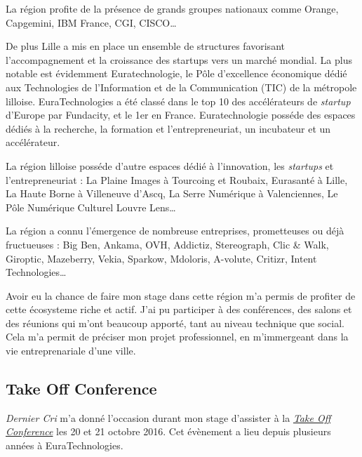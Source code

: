 \bigskip

La région profite de la présence de grands groupes nationaux comme
Orange, Capgemini, IBM France, CGI, CISCO\ldots{}

\bigskip

De plus Lille a mis en place un ensemble de structures favorisant
l'accompagnement et la croissance des startups vers un marché mondial.
La plus notable est évidemment Euratechnologie, le Pôle d'excellence
économique dédié aux Technologies de l'Information et de la
Communication (TIC) de la métropole lilloise. EuraTechnologies a été
classé dans le top 10 des accélérateurs de \emph{startup} d'Europe par
Fundacity, et le 1er en France. Euratechnologie posséde des espaces
dédiés à la recherche, la formation et l'entrepreneuriat, un incubateur
et un accélérateur.

\bigskip

La région lilloise posséde d'autre espaces dédié à l'innovation, les
\emph{startups} et l'entrepreneuriat : La Plaine Images à Tourcoing et
Roubaix, Eurasanté à Lille, La Haute Borne à Villeneuve d'Ascq, La Serre
Numérique à Valenciennes, Le Pôle Numérique Culturel Louvre Lens\ldots{}

\bigskip

La région a connu l'émergence de nombreuse entreprises, prometteuses ou
déjà fructueuses : Big Ben, Ankama, OVH, Addictiz, Stereograph, Clic \&
Walk, Giroptic, Mazeberry, Vekia, Sparkow, Mdoloris, A-volute, Critizr,
Intent Technologies\ldots{}

\bigskip

Avoir eu la chance de faire mon stage dans cette région m'a permis de
profiter de cette écosysteme riche et actif. J'ai pu participer à des
conférences, des salons et des réunions qui m'ont beaucoup apporté, tant
au niveau technique que social. Cela m'a permit de préciser mon projet
professionnel, en m'immergeant dans la vie entreprenariale d'une ville.

\bigskip

\subsection{Take Off Conference}\label{take-off-conference}

\bigskip

\emph{Dernier Cri} m'a donné l'occasion durant mon stage d'assister à la
\href{http://takeoffconf.com/2016}{\emph{Take Off Conference}} les 20 et
21 octobre 2016. Cet évènement a lieu depuis plusieurs années à
EuraTechnologies.


